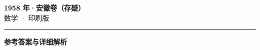\documentclass[zihao=5, a4paper]{ctexart}
\begin{document}
\begin{center}
  {\Large\bfseries 1958 年·安徽卷（存疑）}\\[4pt]
  {\large 数学 · 印刷版}
\end{center}
\medskip
{}

\par\bigskip\hrule\bigskip
{}
\begin{center}{\large\bfseries 参考答案与详细解析}\end{center}
\smallskip

\end{document}
